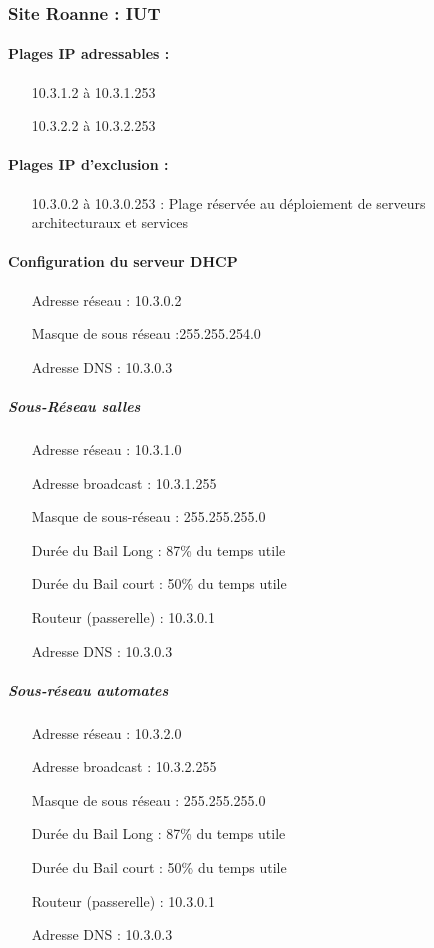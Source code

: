 \documentclass[a4paper]{article}
\begin{document}
\subsubsection{Site Roanne : IUT}

\paragraph{Plages IP adressables :} 
\begin{itemize}
\item[10.3.1.2 à 10.3.1.253]
\item[10.3.2.2 à 10.3.2.253]
\end{itemize}

\paragraph{Plages IP d'exclusion :}
\begin{itemize}
\item[10.3.0.2 à 10.3.0.253] : Plage réservée au déploiement de serveurs architecturaux et services
\end{itemize}

\paragraph{Configuration du serveur DHCP}

\begin{itemize}
\item[Adresse réseau]: 10.3.0.2
\item[Masque de sous réseau]:255.255.254.0
\item[Adresse DNS]: 10.3.0.3
\end{itemize}

\subparagraph{Sous-Réseau salles}
\begin{itemize}
\item[Adresse réseau]: 10.3.1.0
\item[Adresse broadcast]: 10.3.1.255
\item[Masque de sous-réseau]: 255.255.255.0
\item[Durée du Bail Long]: 87\% du temps utile
\item[Durée du Bail court]: 50\% du temps utile
\item[Routeur (passerelle)]: 10.3.0.1
\item[Adresse DNS]: 10.3.0.3
\end{itemize}

\subparagraph{Sous-réseau automates}
\begin{itemize}
\item[Adresse réseau]: 10.3.2.0
\item[Adresse broadcast]: 10.3.2.255
\item[Masque de sous réseau]: 255.255.255.0
\item[Durée du Bail Long]: 87\% du temps utile
\item[Durée du Bail court]: 50\% du temps utile
\item[Routeur (passerelle)]: 10.3.0.1
\item[Adresse DNS]: 10.3.0.3
\end{itemize}
\end{document}
